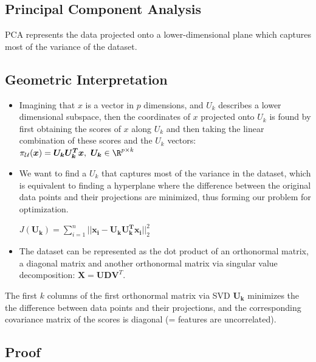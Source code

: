 \documentclass[english]{latex4ei/latex4ei_sheet}
\begin{document}

\newpage

\begin{sectionbox}
\section{Principal Component Analysis}
PCA represents the data projected onto a lower-dimensional plane which captures most of the variance of the dataset.
\subsection{Geometric Interpretation}
\begin{itemize}
\item Imagining that $x$ is a vector in $p$ dimensions, and $U_k$ describes a lower dimensional subspace, then the coordinates of $x$ projected onto $U_k$ is found by first obtaining the scores of $x$ along $U_k$ and then taking the linear combination of these scores and the $U_k$ vectors: $\pi_\mathcal{U}(\boldsymbol{x})=\boldsymbol{U_kU_k^Tx}, \ \boldsymbol{U_k}\in\R^{p\times k}$
\item We want to find a $U_k$ that captures most of the variance in the dataset, which is equivalent to finding a hyperplane where the difference between the original data points and their projections are minimized, thus forming our problem for optimization.\\
\begin{center}
    $J(\boldsymbol{U_k})=\sum\limits_{i=1}^n||\boldsymbol{x_i}-\boldsymbol{U_kU_k^Tx_i}||^2_2$
\end{center}
\item The dataset can be represented as the dot product of an orthonormal matrix, a diagonal matrix and another orthonormal matrix via singular value decomposition: $\boldsymbol{X}=\boldsymbol{UDV}^T$.
\end{itemize}
\begin{emphbox}
    The first $k$ columns of the first orthonormal matrix via SVD $\boldsymbol{U_k}$ minimizes the the difference between data points and their projections, and the corresponding covariance matrix of the scores is diagonal (= features are uncorrelated).
\end{emphbox}
\begin{itemize}
\subsection{Proof}


\end{itemize}
\end{sectionbox}
\end{document}
